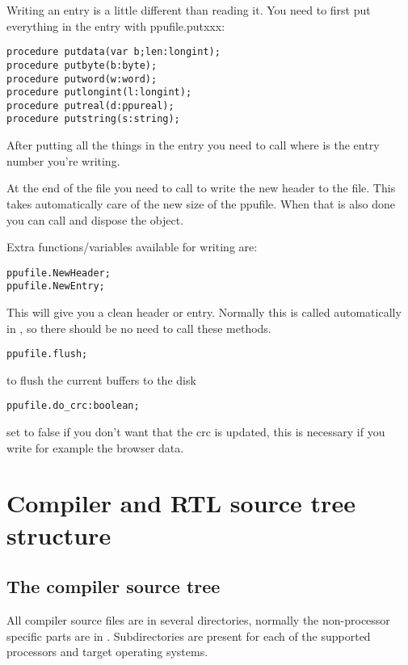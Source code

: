 {Writing an entry is a little different than reading it. You need to first
put everything in the entry with ppufile.putxxx:
\begin{verbatim}
procedure putdata(var b;len:longint);
procedure putbyte(b:byte);
procedure putword(w:word);
procedure putlongint(l:longint);
procedure putreal(d:ppureal);
procedure putstring(s:string);
\end{verbatim}

After putting all the things in the entry you need to call
 where  is the entry number
you're writing.

At the end of the file you need to call  to write the
new header to the file. This takes automatically care of the new size of the
ppufile. When that is also done you can call  and dispose the
object.

Extra functions/variables available for writing are:
\begin{verbatim}
ppufile.NewHeader;
ppufile.NewEntry;
\end{verbatim}
This will give you a clean header or entry. Normally this is called
automatically in , so there should be no need to
call these methods.
\begin{verbatim}
ppufile.flush;
\end{verbatim}

to flush the current buffers to the disk
\begin{verbatim}
ppufile.do_crc:boolean;
\end{verbatim}
set to false if you don't want that the crc is updated, this is necessary
if you write for example the browser data.


\chapter{Compiler and RTL source tree structure}
\label{ch:AppB}

\section{The compiler source tree}

All compiler source files are in several directories, normally the
non-processor specific parts are in . Subdirectories
are present for each of the supported processors and target operating systems.

}
